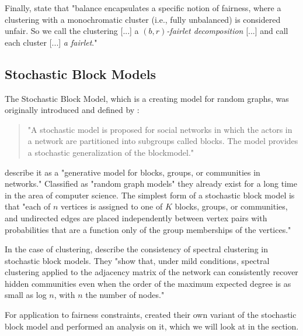 Finally, \textcite[4]{Chierichetti2018} state that "balance encapsulates a specific notion of fairness, where a clustering with a monochromatic cluster (i.e., fully unbalanced) is considered unfair. So we call the clustering [...] a $(b, r)$\textit{-fairlet decomposition} [...] and call each cluster [...] \textit{a fairlet}." \autocite[4]{Chierichetti2018}


\subsection{Stochastic Block Models}

The Stochastic Block Model, which is a creating model for random graphs, was originally introduced and defined by \textcite[]{Holland1983}:

\begin{quote}
"A stochastic model is proposed for social networks in which the actors in a network are partitioned into subgroups called blocks. The model provides a stochastic generalization of the blockmodel."

\autocite[1]{Holland1983}
\end{quote}

\textcite[1]{Karrer2010StochasticNetworks} describe it as a "generative model for blocks, groups, or communities in networks." Classified as "random graph models" they already exist for a long time in the area of computer science.
The simplest form of a stochastic block model is that "each of $n$ vertices is assigned to one of $K$ blocks, groups, or communities, and undirected edges are placed independently between vertex pairs with probabilities that are a function only of the group memberships of the vertices." \autocite[1]{Karrer2010StochasticNetworks}

In the case of clustering, \textcite[]{Lei2013} describe the consistency of spectral clustering in stochastic block models. They "show that, under mild conditions, spectral clustering applied to the adjacency matrix of the network can consistently recover hidden communities even when the order of the maximum expected degree is as small as log $n$, with $n$ the number of nodes." \autocite[1]{Lei2013}

For application to fairness constraints, \textcite[4]{Kleindessner2019} created their own variant of the stochastic block model and performed an analysis on it, which we will look at in the  section.